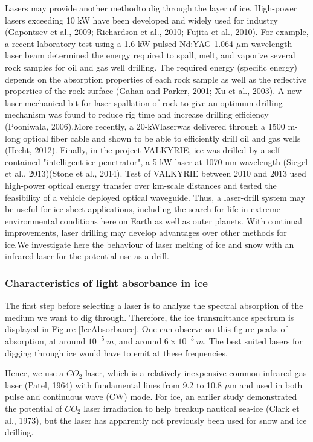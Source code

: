 
Lasers may provide another methodto dig through the layer of ice. High-power lasers exceeding 10 kW have been developed and widely used for industry (Gapontsev et al., 2009; Richardson et al., 2010; Fujita et al., 2010). For example, a recent laboratory test using a 1.6-kW pulsed Nd:YAG 1.064 $\mu$m wavelength laser beam determined the energy required to spall, melt, and
vaporize several rock samples for oil and gas well drilling. The required energy (specific energy) depends on the absorption properties of each rock sample as well as the reflective properties of the rock surface  (Gahan and Parker, 2001; Xu et al., 2003). A new laser-mechanical bit for laser spallation of rock to give an optimum drilling mechanism
was found to reduce rig time and increase drilling efficiency (Pooniwala, 2006).More recently, a 20-kWlaserwas delivered through a 1500 m-long optical fiber cable and shown to be able to efficiently drill oil and gas wells (Hecht, 2012). Finally, in the project VALKYRIE,
ice was drilled by a self-contained "intelligent ice penetrator", a 5 kW laser at 1070 nm wavelength (Siegel et al., 2013)(Stone et al., 2014).
Test of VALKYRIE between 2010 and 2013 used high-power optical energy transfer over km-scale distances and tested the feasibility of a vehicle deployed optical waveguide. Thus, a laser-drill system may be useful for ice-sheet applications, including the search for life in extreme environmental conditions here on Earth as well as outer planets.
With continual improvements, laser drilling may develop advantages over other methods for ice.We investigate here the behaviour of laser melting of ice and snow with an infrared laser for the potential use as a drill.

\subsubsection{Characteristics of light absorbance in ice}

The first step before selecting a laser is to analyze the spectral absorption of the medium we want to dig through. Therefore, the ice transmittance spectrum is displayed in Figure \ref{IceAbsorbance}. One can observe on this figure peaks of absorption, at around $10^{-5}~m$, and around $6\times10^{-5}~m$. The best suited lasers for digging through ice would have to emit at these frequencies.

Hence, we use a $CO_2$ laser, which is a relatively inexpensive common infrared gas laser (Patel, 1964) with fundamental lines from 9.2 to 10.8 $\mu$m and used in both pulse and continuous wave (CW) mode. For ice, an earlier study demonstrated the potential of $CO_2$ laser irradiation to help breakup nautical sea-ice (Clark et al.,  1973), but the laser has apparently not previously been used for snow and ice drilling.


